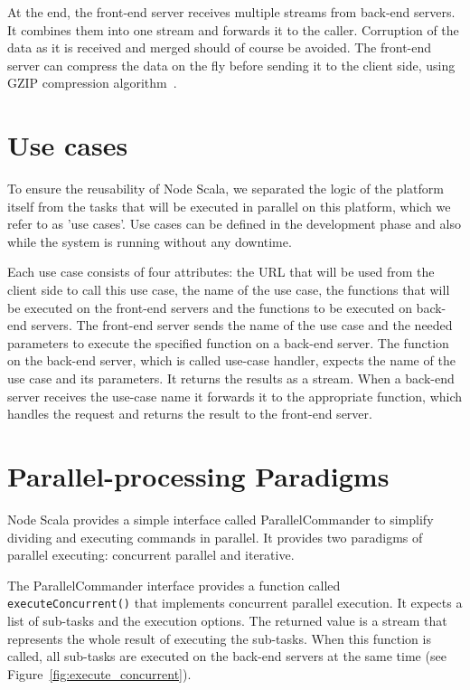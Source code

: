\documentclass[10pt,conference,letterpaper]{IEEEtran}
\begin{document}
At the end, the front-end server receives multiple streams from
back-end servers. It combines them into one stream and forwards it to
the caller. Corruption of the data as it is received and merged should
of course be avoided. The front-end server can compress the data on
the fly before sending it to the client side, using GZIP compression
algorithm~\cite{GZIP}.

\section{Use cases}

To ensure the reusability of Node Scala, we separated the logic of the
platform itself from the tasks that will be executed in parallel on
this platform, which we refer to as 'use cases'. Use cases can be
defined in the development phase and also while the system is running
without any downtime.

Each use case consists of four attributes: the URL that will be used
from the client side to call this use case, the name of the use case,
the functions that will be executed on the front-end servers and the
functions to be executed on back-end servers. The front-end server
sends the name of the use case and the needed parameters to execute
the specified function on a back-end server. The function on the
back-end server, which is called use-case handler, expects the name of
the use case and its parameters. It returns the results as a
stream. When a back-end server receives the use-case name it forwards
it to the appropriate function, which handles the request and returns
the result to the front-end server.

\section{Parallel-processing Paradigms}\label{lab:parallel}

Node Scala provides a simple interface called ParallelCommander to
simplify dividing and executing commands in parallel. It provides two
paradigms of parallel executing: concurrent parallel and iterative.

The ParallelCommander interface provides a function called
\texttt{executeConcurrent()} that implements concurrent parallel execution. It
expects a list of sub-tasks and the execution options. The returned
value is a stream that represents the whole result of executing the
sub-tasks. When this function is called, all sub-tasks are executed on
the back-end servers at the same time (see Figure~\ref{fig:execute_concurrent}).
\end{document}
